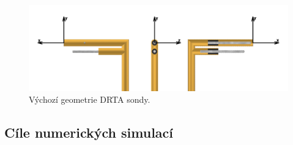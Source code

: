         \begin{figure}[ht!]
            \centering
            \includegraphics[width=\textwidth]{200_DRTA_SONDA/Vychozi_DRTA.png}
            \caption{Výchozí geometrie DRTA sondy.}
            \label{fig:vychozi-DRTA}
        \end{figure}
    \subsection{Cíle numerických simulací}
        